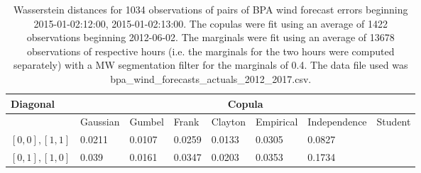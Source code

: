 \begin{table}[h] 
    \centering 
    \begin{tabular}{|l|l|l|l|l|l|l|l|} \hline 
        \textbf{Diagonal} & \multicolumn{7}{c|}{\textbf{Copula}} \\ \hline 
        & Gaussian & Gumbel & Frank & Clayton & Empirical & Independence & Student \\ \hline 
        $[0,0], [1,1]$ & 0.0211 & 0.0107 & 0.0259 & 0.0133 & 0.0305 & 0.0827 &  \\ \hline 
        $[0,1], [1,0]$ & 0.039 & 0.0161 & 0.0347 & 0.0203 & 0.0353 & 0.1734 &  \\ \hline 
    \end{tabular} 
    \caption{Wasserstein distances for 1034 observations of pairs of BPA wind forecast errors beginning 2015-01-02:12:00, 2015-01-02:13:00. The copulas were fit  using an average of 1422 observations beginning 2012-06-02. The marginals were fit using an average of 13678 observations of respective hours (i.e. the  marginals for the two hours were computed separately) with a MW segmentation filter for the marginals of 0.4. The data file used was bpa\_wind\_forecasts\_actuals\_2012\_2017.csv.} 
\end{table}